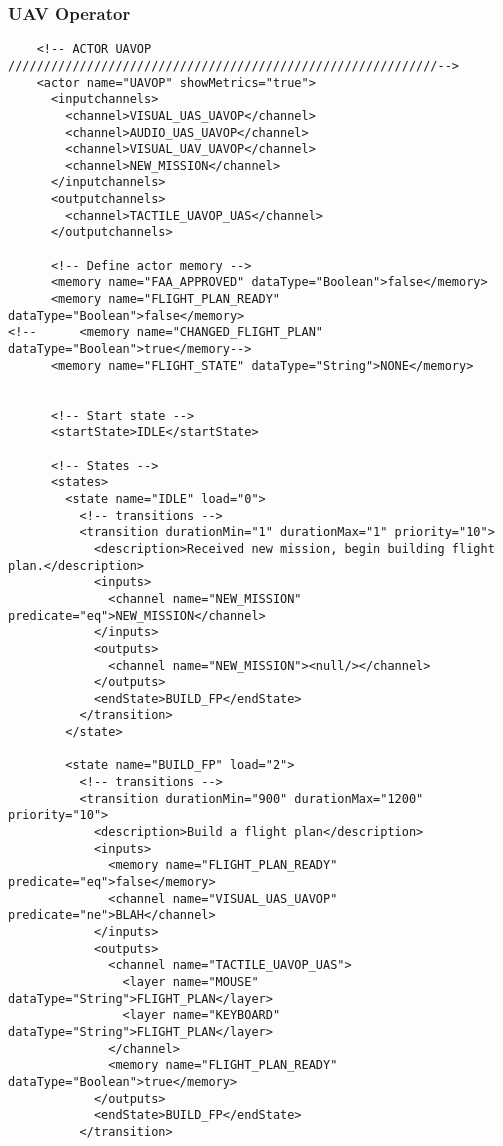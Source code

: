 \subsubsection{UAV Operator}
\begin{verbatim}
	<!-- ACTOR UAVOP   ////////////////////////////////////////////////////////////-->
    <actor name="UAVOP" showMetrics="true">
      <inputchannels>
        <channel>VISUAL_UAS_UAVOP</channel>
        <channel>AUDIO_UAS_UAVOP</channel>
        <channel>VISUAL_UAV_UAVOP</channel>
        <channel>NEW_MISSION</channel>
      </inputchannels>
      <outputchannels>
        <channel>TACTILE_UAVOP_UAS</channel>
      </outputchannels>
      
      <!-- Define actor memory -->
      <memory name="FAA_APPROVED" dataType="Boolean">false</memory>
      <memory name="FLIGHT_PLAN_READY" dataType="Boolean">false</memory>
<!--      <memory name="CHANGED_FLIGHT_PLAN" dataType="Boolean">true</memory-->
      <memory name="FLIGHT_STATE" dataType="String">NONE</memory>
      
      
      <!-- Start state -->
      <startState>IDLE</startState>
      
      <!-- States -->
      <states>
        <state name="IDLE" load="0">
          <!-- transitions -->
          <transition durationMin="1" durationMax="1" priority="10">
            <description>Received new mission, begin building flight plan.</description>
            <inputs>
              <channel name="NEW_MISSION" predicate="eq">NEW_MISSION</channel>
            </inputs>
            <outputs>
              <channel name="NEW_MISSION"><null/></channel>
            </outputs>
            <endState>BUILD_FP</endState>
          </transition>
        </state>
        
        <state name="BUILD_FP" load="2">
          <!-- transitions -->
          <transition durationMin="900" durationMax="1200" priority="10">
            <description>Build a flight plan</description>
            <inputs>
              <memory name="FLIGHT_PLAN_READY" predicate="eq">false</memory>
              <channel name="VISUAL_UAS_UAVOP" predicate="ne">BLAH</channel>
            </inputs>
            <outputs>
              <channel name="TACTILE_UAVOP_UAS">
                <layer name="MOUSE" dataType="String">FLIGHT_PLAN</layer>
                <layer name="KEYBOARD" dataType="String">FLIGHT_PLAN</layer>
              </channel>
              <memory name="FLIGHT_PLAN_READY" dataType="Boolean">true</memory>
            </outputs>
            <endState>BUILD_FP</endState>
          </transition>
          

\end{verbatim}
